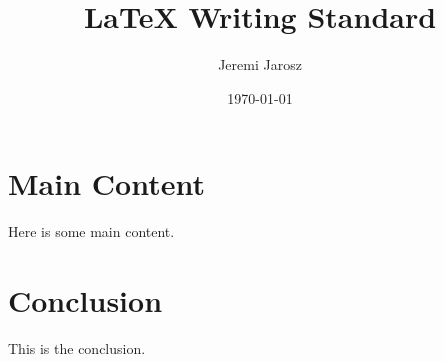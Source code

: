 \documentclass{article}
\title{LaTeX Writing Standard}
\author{Jeremi Jarosz}
\date{\today}
\begin{document}
\maketitle

\newpage

\tableofcontents

\newpage



\section{Main Content}

Here is some main content.

\section{Conclusion}

This is the conclusion.
\end{document}
